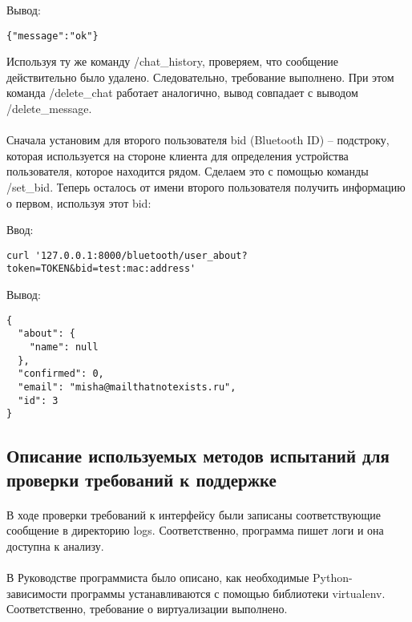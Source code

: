 \documentclass[testmethods]{espd}
\begin{document}
Вывод:

\begin{verbatim}
{"message":"ok"}
\end{verbatim}

Используя ту же команду /chat\_history, проверяем, что сообщение действительно было удалено. Следовательно, требование выполнено. При этом команда /delete\_chat работает аналогично, вывод совпадает с выводом /delete\_message.

\paragraph{} %
Сначала установим для второго пользователя bid (Bluetooth ID) -- подстроку, которая используется на стороне клиента для определения устройства пользователя, которое находится рядом. Сделаем это с помощью команды /set\_bid. Теперь осталось от имени второго пользователя получить информацию о первом, используя этот bid:

Ввод:

\begin{verbatim}
curl '127.0.0.1:8000/bluetooth/user_about?token=TOKEN&bid=test:mac:address'
\end{verbatim}

Вывод:

\begin{verbatim}
{
  "about": {
    "name": null
  },
  "confirmed": 0,
  "email": "misha@mailthatnotexists.ru",
  "id": 3
}
\end{verbatim}

\subsection{Описание используемых методов испытаний для проверки требований к поддержке}
\paragraph{} %
В ходе проверки требований к интерфейсу были записаны соответствующие сообщение в директорию logs. Соответственно, программа пишет логи и она доступна к анализу.

\paragraph{} %
В Руководстве программиста было описано, как необходимые Python-зависимости программы устанавливаются с помощью библиотеки virtualenv. Соответственно, требование о виртуализации выполнено.
\end{document}
